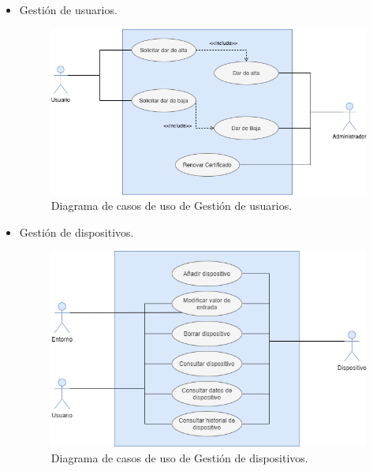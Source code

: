 \begin{itemize}
    \item Gestión de usuarios.
    
    \vspace{5mm}

    \begin{figure}[h!]
        \centering
        \includegraphics[width=12cm]{imagenes/diagramas/diagrama_gestion_usuarios}
        \caption{Diagrama de casos de uso de Gestión de usuarios.}
        \label{fig:gestion-de-usuarios}
    \end{figure}

    \newpage

    \item Gestión de dispositivos.
    
    \vspace{5mm}

    \begin{figure}[h!]
        \centering
        \includegraphics[width=12cm]{imagenes/diagramas/diagrama_gestion_dispositivos}
        \caption{Diagrama de casos de uso de Gestión de dispositivos.}
        \label{fig:gestion-de-dispositivos}
    \end{figure}


\end{itemize}
